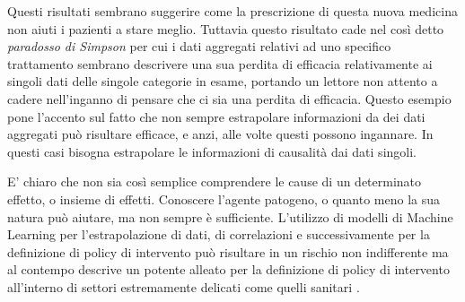 Questi risultati sembrano suggerire come la prescrizione 
di questa nuova medicina non aiuti i pazienti a stare meglio.
Tuttavia questo risultato cade nel così detto \emph{paradosso di Simpson}
\cite{wiki:Simpson's_paradox} per cui i dati aggregati relativi 
ad uno specifico trattamento sembrano descrivere una sua 
perdita di efficacia relativamente ai singoli dati delle 
singole categorie in esame, portando un lettore non attento 
a cadere nell'inganno di pensare che ci sia una perdita di 
efficacia. Questo esempio pone l'accento sul fatto che non sempre
estrapolare informazioni da dei dati aggregati può risultare
efficace, e anzi, alle volte questi possono ingannare.
In questi casi bisogna estrapolare le informazioni di 
causalità dai dati singoli.

E' chiaro che non sia così semplice comprendere le cause 
di un determinato effetto, o insieme di effetti. Conoscere
l'agente patogeno, o quanto meno la sua natura può aiutare,
ma non sempre è sufficiente. L'utilizzo di modelli di 
Machine Learning per l'estrapolazione di dati, di correlazioni
e successivamente per la definizione di policy di intervento
può risultare in un rischio non indifferente ma al contempo 
descrive un potente alleato per la definizione di policy di 
intervento all'interno di settori estremamente delicati come 
quelli sanitari \cite{doi:10.1098/rsos.220638}.